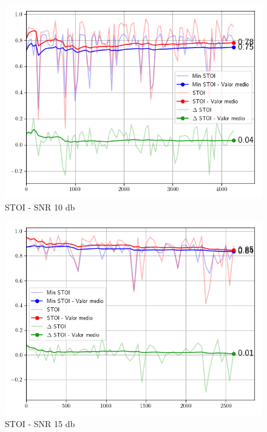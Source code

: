 \begin{figure}
	\centering
	\centerline{\includegraphics[scale=0.70]{images/ch7/objective_metrics/metric_STOI_10db.png}}
	\caption{STOI - SNR 10 db}
	\label{fig:ch7_stoi_ten_db}
\end{figure}

\begin{figure}
	\centering
	\centerline{\includegraphics[scale=0.70]{images/ch7/objective_metrics/metric_STOI_15db.png}}
	\caption{STOI - SNR 15 db}
	\label{fig:ch7_stoi_fifteen_db}
\end{figure}

